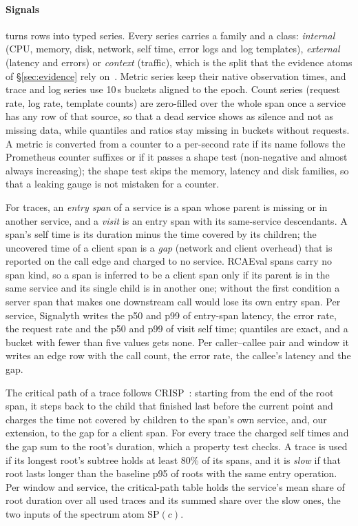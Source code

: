 \paragraph{Signals}
 turns rows into typed series.
Every series carries a family and a class: \emph{internal} (CPU, memory, disk, network, self time, error logs and log templates), \emph{external} (latency and errors) or \emph{context} (traffic), which is the split that the evidence atoms of \S\ref{sec:evidence} rely on~\cite{prism2026}.
Metric series keep their native observation times, and trace and log series use 10\,s buckets aligned to the epoch.
Count series (request rate, log rate, template counts) are zero-filled over the whole span once a service has any row of that source, so that a dead service shows as silence and not as missing data, while quantiles and ratios stay missing in buckets without requests.
A metric is converted from a counter to a per-second rate if its name follows the Prometheus counter suffixes or if it passes a shape test (non-negative and almost always increasing); the shape test skips the memory, latency and disk families, so that a leaking gauge is not mistaken for a counter.

For traces, an \emph{entry span} of a service is a span whose parent is missing or in another service, and a \emph{visit} is an entry span with its same-service descendants.
A span's self time is its duration minus the time covered by its children; the uncovered time of a client span is a \emph{gap} (network and client overhead) that is reported on the call edge and charged to no service.
RCAEval spans carry no span kind, so a span is inferred to be a client span only if its parent is in the same service and its single child is in another one; without the first condition a server span that makes one downstream call would lose its own entry span.
Per service, Signalyth writes the p50 and p99 of entry-span latency, the error rate, the request rate and the p50 and p99 of visit self time; quantiles are exact, and a bucket with fewer than five values gets none.
Per caller--callee pair and window it writes an edge row with the call count, the error rate, the callee's latency and the gap.

The critical path of a trace follows CRISP~\cite{crisp2022}: starting from the end of the root span, it steps back to the child that finished last before the current point and charges the time not covered by children to the span's own service, and, our extension, to the gap for a client span.
For every trace the charged self times and the gap sum to the root's duration, which a property test checks.
A trace is used if its longest root's subtree holds at least 80\% of its spans, and it is \emph{slow} if that root lasts longer than the baseline p95 of roots with the same entry operation.
Per window and service, the critical-path table holds the service's mean share of root duration over all used traces and its summed share over the slow ones, the two inputs of the spectrum atom $\text{SP}(c)$.

